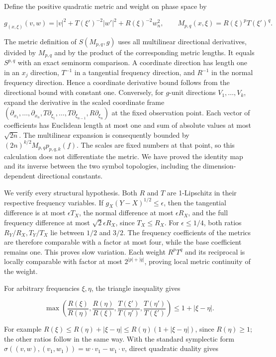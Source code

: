 \documentclass[
  11pt,
]{article}
\begin{document}
Define the positive quadratic metric and weight on phase space by

\[
g_{(x,\xi)}(v,w)=|v|^2+T(\xi')^{-2}|w'|^2+R(\xi)^{-2}w_n^2,
\qquad M_{p,q}(x,\xi)=R(\xi)^pT(\xi')^q.
\tag{MC8}
\]

The metric definition of \(S(M_{p,q},g)\) uses all multilinear
directional derivatives, divided by \(M_{p,q}\) and by the product of
the corresponding metric lengths. It equals \(S^{p,q}\) with an exact
seminorm comparison. A coordinate direction has length one in an \(x_j\)
direction, \(T^{-1}\) in a tangential frequency direction, and
\(R^{-1}\) in the normal frequency direction. Hence a coordinate
derivative bound follows from the directional bound with constant one.
Conversely, for \(g\)-unit directions \(V_1,\ldots,V_k\), expand the
derivative in the scaled coordinate frame
\((\partial_{x_1},\ldots,\partial_{x_n},T\partial_{\xi_1},\ldots,T\partial_{\xi_{n-1}},R\partial_{\xi_n})\)
at the fixed observation point. Each vector of coefficients has
Euclidean length at most one and sum of absolute values at most
\(\sqrt{2n}\). The multilinear expansion is consequently bounded by
\((2n)^{k/2}M_{p,q}p_{p,q,k}(f)\). The scales are fixed numbers at that
point, so this calculation does not differentiate the metric. We have
proved the identity map and its inverse between the two symbol
topologies, including the dimension-dependent directional constants.

We verify every structural hypothesis. Both \(R\) and \(T\) are
1-Lipschitz in their respective frequency variables. If
\(g_X(Y-X)^{1/2}\leq\epsilon\), then the tangential difference is at
most \(\epsilon T_X\), the normal difference at most \(\epsilon R_X\),
and the full frequency difference at most \(\sqrt2\epsilon R_X\), since
\(T_X\leq R_X\). For \(\epsilon\leq1/4\), both ratios
\(R_Y/R_X,T_Y/T_X\) lie between \(1/2\) and \(3/2\). The frequency
coefficients of the metrics are therefore comparable with a factor at
most four, while the base coefficient remains one. This proves slow
variation. Each weight \(R^pT^q\) and its reciprocal is locally
comparable with factor at most \(2^{|p|+|q|}\), proving local metric
continuity of the weight.

For arbitrary frequencies \(\xi,\eta\), the triangle inequality gives

\[
\max\left(\frac{R(\xi)}{R(\eta)},\frac{R(\eta)}{R(\xi)},
          \frac{T(\xi')}{T(\eta')},\frac{T(\eta')}{T(\xi')}\right)
\leq1+|\xi-\eta|.
\tag{MC9}
\]

For example \(R(\xi)\leq R(\eta)+|\xi-\eta|\leq R(\eta)(1+|\xi-\eta|)\),
since \(R(\eta)\geq1\); the other ratios follow in the same way. With
the standard symplectic form
\(\sigma((v,w),(v_1,w_1))=w\cdot v_1-w_1\cdot v\), direct quadratic
duality gives
\end{document}
